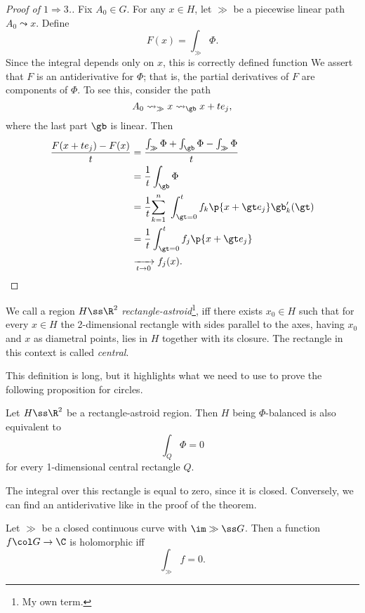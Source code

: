 \begin{proof}[Proof of $1 \Rightarrow 3$.]
  Fix $A_0 \in G$. For any $x \in H$, let $\gg$ be a piecewise linear path $A_0 \leadsto x$. Define
  $$ F(x) = \int_\gg \Phi. $$
  Since the integral depends only on $x$, this is correctly defined function
  We assert that $F$ is an antiderivative for $\Phi$; that is, the partial derivatives of $F$ are components of $\Phi$.
  To see this, consider the path
  $$ A_0 \leadsto_\gg x \leadsto_\gb x+te_j, $$
  where the last part $\gb$ is linear.
  Then
  \begin{align*}
    \frac{F(x+te_j) - F(x)}{t}
    &= \frac{\int_\gg \Phi + \int_{\gb} \Phi - \int_\gg \Phi}{t}  \\
    &= \frac{1}{t} \int_{\gb} \Phi \\
    &= \frac{1}{t} { \sum_{k=1}^n\ \int_{\gt=0}^t f_k\p{x+\gt e_j} \gb_k'(\gt) } \\
    &= \frac{1}{t} \int_{\gt=0}^t f_j\p{x+\gt e_j} \\
    &\xrightarrow[t \to 0]{} {f_j(x)}.
  \end{align*}
\end{proof}

\begin{definition}
  We call a region $H \ss \R^2$ \emph{rectangle-astroid}\footnote{My own term.}, iff there exists $x_0 \in H$ such that for every $x \in H$ the 2-dimensional rectangle with sides parallel to the axes, having $x_0$ and $x$ as diametral points, lies in $H$ together with its closure. The rectangle in this context is called \emph{central}.
\end{definition}

This definition is long, but it highlights what we need to use to prove the following proposition for circles.

\begin{lemma}
  Let $H \ss \R^2$ be a rectangle-astroid region. Then $H$ being $\Phi$-balanced is also equivalent to
  $$ \int_Q \Phi = 0 $$
  for every 1-dimensional central rectangle $Q$. 
\end{lemma}

\begin{idea}
  The integral over this rectangle is equal to zero, since it is closed. Conversely, we can find an antiderivative like in the proof of the theorem.
\end{idea}

\begin{theorem}
  Let $\gg$ be a closed continuous curve with $\im \gg \ss G$.
  Then a function $f \col G \to \C$ is holomorphic iff
  $$ \int_\gg f = 0. $$
\end{theorem}

